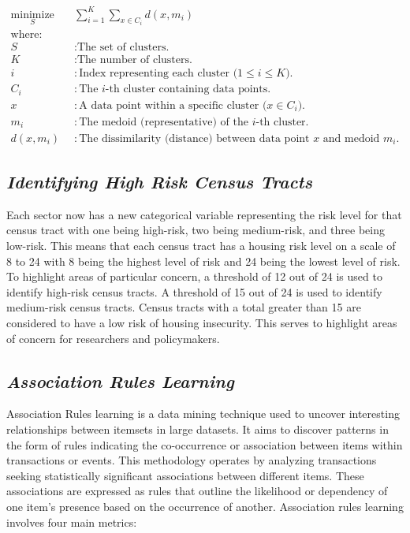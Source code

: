 \begin{equation}\label{eq:k-medoids}
    \begin{aligned}
        \underset{S}{\text{minimize}} \quad & \sum_{i=1}^{K} \sum_{x \in C_i} d(x, m_i) \\
        \text{where:} \\
        S & : \text{The set of clusters.} \\
        K & : \text{The number of clusters.} \\
        i & : \text{Index representing each cluster (\(1 \leq i \leq K\)).} \\
        C_i & : \text{The \(i\)-th cluster containing data points.} \\
        x & : \text{A data point within a specific cluster (\(x \in C_i\)).} \\
        m_i & : \text{The medoid (representative) of the \(i\)-th cluster.} \\
        d(x, m_i) & : \text{The dissimilarity (distance) between data point \(x\) and medoid \(m_i\).}
    \end{aligned}
\end{equation}


\subsection{\textit{Identifying High Risk Census Tracts}}
Each sector now has a new categorical variable representing the risk level for that census tract with one being high-risk, two being medium-risk, and three being low-risk. This means that each census tract has a housing risk level on a scale of 8 to 24 with 8 being the highest level of risk and 24 being the lowest level of risk. To highlight areas of particular concern, a threshold of 12 out of 24 is used to identify high-risk census tracts. A threshold of 15 out of 24 is used to identify medium-risk census tracts. Census tracts with a total greater than 15 are considered to have a low risk of housing insecurity. This serves to highlight areas of concern for researchers and policymakers. 

\subsection{\textit{Association Rules Learning}}

Association Rules learning is a data mining technique used to uncover interesting relationships between itemsets in large datasets. It aims to discover patterns in the form of rules indicating the co-occurrence or association between items within transactions or events. This methodology operates by analyzing transactions seeking statistically significant associations between different items. These associations are expressed as rules that outline the likelihood or dependency of one item's presence based on the occurrence of another. Association rules learning involves four main metrics:

